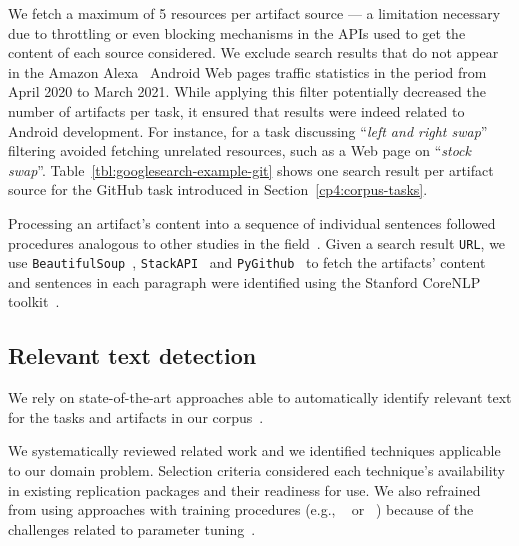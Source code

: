 We fetch a maximum of 5 resources per artifact source --- a limitation necessary due to throttling or even blocking mechanisms in the APIs used to get the content of each source considered. We exclude search results that do not appear in the Amazon Alexa~\cite{alexa} Android Web pages traffic statistics in the period from April 2020 to March 2021. 
While applying this filter potentially decreased the number of artifacts per task, it ensured that results were indeed related to Android development. 
For instance, for a task discussing ``\textit{left and right swap}'' 
filtering avoided fetching unrelated resources, such as a Web page on  ``\textit{stock swap}''.
Table~\ref{tbl:googlesearch-example-git} shows one search result per artifact source for the GitHub task introduced in Section~\ref{cp4:corpus-tasks}.


Processing an artifact's content into a sequence of individual sentences 
followed procedures analogous to other studies in the field~\cite{Arya2019, nadi2020}.
Given a search result \texttt{URL}, we use \texttt{BeautifulSoup}~\cite{beautifulsoup4},
\texttt{StackAPI}~\cite{StackAPI} and \texttt{PyGithub}~\cite{PyGithub}
to fetch the artifacts' content and sentences in each paragraph
were identified using the Stanford CoreNLP toolkit~\cite{CoreNLP}.












\subsection{Relevant text detection}
\label{cp4:corpus-relevant-text}




 
We rely on state-of-the-art approaches able to automatically identify relevant text for the tasks and artifacts in our corpus~\cite{nadi2020, Robillard2015, Lotufo2012, Xu2017}.


We systematically reviewed related work and we identified techniques applicable to our domain problem. Selection criteria considered each technique's availability in existing replication packages and their readiness for use.
We also refrained from using approaches with training procedures (e.g., ~\cite{liu2020} or ~\cite{Treude2016}) because of the challenges related to parameter tuning~\cite{Chaparro2017, fucci2019}.



